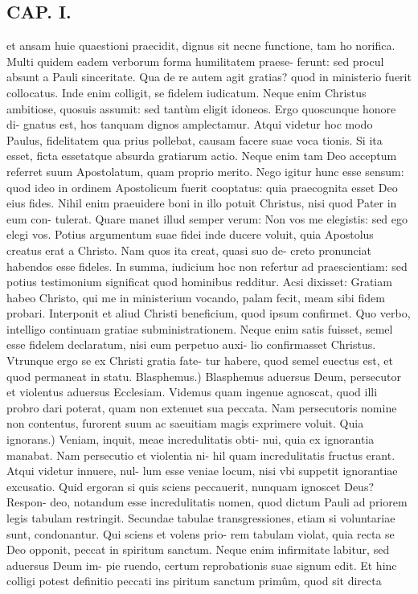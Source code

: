 \documentclass{article}
\begin{document}
\begin{pages}
\section*{CAP. I. }
\marginpar{[ p.9 ]}\pstart et ansam huie quaestioni praecidit, dignus sit necne functione, tam ho norifica. Multi quidem eadem verborum forma humilitatem praese- ferunt: sed procul absunt a Pauli sinceritate. Qua de re autem agit gratias? quod in ministerio fuerit collocatus. Inde enim colligit, se fidelem iudicatum. Neque enim Christus ambitiose, quosuis assumit: sed tantùm eligit idoneos. Ergo quoscunque honore di- gnatus est, hos tanquam dignos amplectamur. Atqui videtur hoc modo Paulus, fidelitatem qua prius pollebat, causam facere suae voca tionis. Si ita esset, ficta essetatque absurda gratiarum actio. Neque enim tam Deo acceptum referret suum Apostolatum, quam proprio merito. Nego igitur hunc esse sensum: quod ideo in ordinem Apostolicum fuerit cooptatus: quia praecognita esset Deo eius fides. Nihil enim praeuidere boni in illo potuit Christus, nisi quod Pater in eum con- tulerat. Quare manet illud semper verum: Non vos me elegistis: sed ego elegi vos. Potius argumentum suae fidei inde ducere voluit, quia Apostolus creatus erat a Christo. Nam quos ita creat, quasi suo de- creto pronunciat habendos esse fideles. In summa, iudicium hoc non refertur ad praescientiam: sed potius testimonium significat quod hominibus redditur. Acsi dixisset: Gratiam habeo Christo, qui me in ministerium vocando, palam fecit, meam sibi fidem probari. Interponit et aliud Christi beneficium, quod ipsum confirmet. Quo verbo, intelligo continuam gratiae subministrationem. Neque enim satis fuisset, semel esse fidelem declaratum, nisi eum perpetuo auxi- lio confirmasset Christus. Vtrunque ergo se ex Christi gratia fate- tur habere, quod semel euectus est, et quod permaneat in statu.  \pend\pstart Blasphemus.) Blasphemus aduersus Deum, persecutor et violentus aduersus Ecclesiam. Videmus quam ingenue agnoscat, quod illi probro dari poterat, quam non extenuet sua peccata. Nam persecutoris nomine non contentus, furorent suum ac saeuitiam magis exprimere voluit.  \pend\pstart Quia ignorans.) Veniam, inquit, meae incredulitatis obti- nui, quia ex ignorantia manabat. Nam persecutio et violentia ni- hil quam incredulitatis fructus erant. Atqui videtur innuere, nul- lum esse veniae locum, nisi vbi suppetit ignorantiae excusatio. Quid ergoran si quis sciens peccauerit, nunquam ignoscet Deus? Respon- deo, notandum esse incredulitatis nomen, quod dictum Pauli ad priorem legis tabulam restringit. Secundae tabulae transgressiones, etiam si voluntariae sunt, condonantur. Qui sciens et volens prio- rem tabulam violat, quia recta se Deo opponit, peccat in spiritum sanctum. Neque enim infirmitate labitur, sed aduersus Deum im- pie ruendo, certum reprobationis suae signum edit. Et hinc colligi potest definitio peccati ins piritum sanctum primûm, quod sit directa  \pend

\end{pages}
\end{document}
